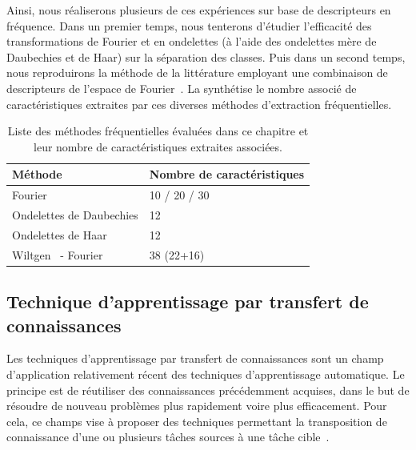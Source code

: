 Ainsi, nous réaliserons plusieurs de ces expériences sur base de descripteurs en fréquence. Dans un premier temps, nous tenterons d'étudier l'efficacité des transformations de Fourier et en ondelettes (à l'aide des ondelettes mère de Daubechies et de Haar) sur la séparation des classes. Puis dans un second temps, nous reproduirons la méthode de la littérature employant une combinaison de descripteurs de l'espace de Fourier~\cite{Wiltgen2008}. La  synthétise le nombre associé de caractéristiques extraites par ces diverses méthodes d'extraction fréquentielles.\par

\begin{table}[H]
    \centering
    \begin{tabular}{ll}
        \toprule
        \textbf{Méthode}                        & \textbf{Nombre de caractéristiques}   \\ \hline
        Fourier                                 & 10 / 20 / 30                          \\ \hline
        Ondelettes de Daubechies                & 12                                    \\ \hline
        Ondelettes de Haar                      & 12                                    \\ \hline
        Wiltgen~\cite{Wiltgen2008} - Fourier    & 38 (22+16)                             \\
        \bottomrule
    \end{tabular}
    \caption{Liste des méthodes fréquentielles évaluées dans ce chapitre et leur nombre de caractéristiques extraites associées.}
    \label{tab:number_features_frequency}
\end{table}\par

\subsection{Technique d'apprentissage par transfert de connaissances}
Les techniques d'apprentissage par transfert de connaissances sont un champ d'application relativement récent des techniques d'apprentissage automatique. Le principe est de réutiliser des connaissances précédemment acquises, dans le but de résoudre de nouveau problèmes plus rapidement voire plus efficacement. Pour cela, ce champs vise à proposer des techniques permettant la transposition de connaissance d'une ou plusieurs tâches sources à une tâche cible~\cite{QiangYang2010}.\par

